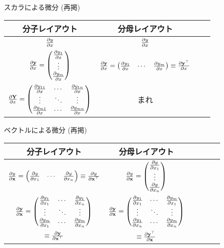 \documentclass[dvipdfmx,notheorems,t]{beamer}
\begin{document}
\begin{frame}{スカラによる微分 (再掲)}
\begin{table}[h]
  \centering
  \begin{tabular}{ScSc}
    分子レイアウト & 分母レイアウト \\ \hline
    $\pdv{y}{x}$ & $\pdv{y}{x}$ \\ \hline
    $\pdv{\vb{y}}{x} = \mqty(\pdv{y_1}{x} \\ \vdots \\ \pdv{y_m}{x})$
      & $\pdv{\vb{y}}{x} = \mqty(\pdv{y_1}{x} & \cdots & \pdv{y_m}{x}) \equiv \pdv{\vb{y}^\top}{x} $ \\ \hline
    $\pdv{\vb{Y}}{x} = \mqty(\pdv{y_{11}}{x} & \cdots & \pdv{y_{1n}}{x} \\
      \vdots & \ddots & \vdots \\
      \pdv{y_{m1}}{x} & \cdots & \pdv{y_{mn}}{x})$ & まれ
  \end{tabular}
\end{table}
\end{frame}

\begin{frame}{ベクトルによる微分 (再掲)}
\begin{table}[h]
  \centering
  \begin{tabular}{ScSc}
    分子レイアウト & 分母レイアウト \\ \hline
    $\pdv{y}{\vb{x}} = \mqty(\pdv{y}{x_1} & \cdots & \pdv{y}{x_n}) \equiv \pdv{y}{\vb{x}^\top}$
      & $\pdv{y}{\vb{x}} = \mqty(\pdv{y}{x_1} \\ \vdots \\ \pdv{y}{x_n})$ \\ \hline
    $\pdv{\vb{y}}{\vb{x}} = \mqty(\pdv{y_1}{x_1} & \cdots & \pdv{y_1}{x_n} \\
      \vdots & \ddots & \vdots \\
      \pdv{y_m}{x_1} & \cdots & \pdv{y_m}{x_n})$
      & $\pdv{\vb{y}}{\vb{x}} = \mqty(\pdv{y_1}{x_1} & \cdots & \pdv{y_m}{x_1} \\
      \vdots & \ddots & \vdots \\
      \pdv{y_1}{x_n} & \cdots & \pdv{y_m}{x_n})$ \\
    $\equiv \pdv{\vb{y}}{\vb{x}^\top}$ & $ \equiv \pdv{\vb{y}^\top}{\vb{x}}$
  \end{tabular}
\end{table}
\end{frame}
\end{document}
